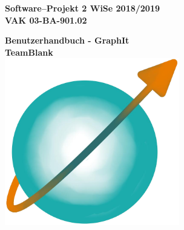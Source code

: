 \documentclass[enabledeprecatedfontcommands,fontsize=11pt,paper=a4,twoside]{scrartcl}
\begin{document}
  \thispagestyle{fancy}
  \fancyhead[LO,RE]{ }
  \fancyfoot[C]{}

  \vspace{3cm}

  \begin{minipage}[H]{\textwidth}
  \begin{center}
  \bf
  \Large
  Software--Projekt 2 WiSe 2018/2019\\
  \smallskip
  \small
  VAK 03-BA-901.02\\
  \vspace{3cm}
  \end{center}
  \end{minipage}
  \begin{minipage}[H]{\textwidth}
  \begin{center}
  \vspace{1cm}
  \bf
  \Large Benutzerhandbuch - GraphIt \\
  TeamBlank \\
  \vspace{2cm}
  \includegraphics[width=3.0in]{logo_graphit.png}

  
  \end{center}
 
  \end{minipage}
  \vfill
\end{document}
